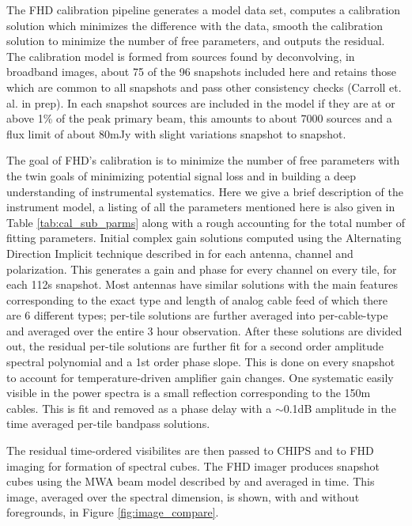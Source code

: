 \documentclass[twolcolumn,iop]{emulateapj}
\begin{document}
The FHD calibration pipeline generates a model data set, computes a calibration solution which minimizes the difference with the data, smooth the calibration solution to minimize the number of free parameters, and outputs the residual. The calibration model is formed from sources found by deconvolving, in broadband images, about 75 of the 96 snapshots included here and retains those which are common to all snapshots and pass other consistency checks (Carroll et. al. in prep). In each snapshot sources are included in the model if they are at or above 1\% of the peak primary beam, this amounts to about 7000 sources and a flux limit of about 80mJy with slight variations snapshot to snapshot. %


The goal of FHD's calibration is to minimize the number of free parameters with the twin goals of minimizing potential signal loss and in building a deep understanding of instrumental systematics. Here we give a brief description of the instrument model, a listing of all the parameters mentioned here is also given in Table \ref{tab:cal_sub_parms} along with a rough accounting for the total number of fitting parameters. Initial complex gain solutions computed using the Alternating Direction Implicit technique described in \citet{sal14} for each antenna, channel and polarization.  This generates a gain and phase for every channel on every tile, for each 112s snapshot.  Most antennas have similar solutions with the main features corresponding to the exact type and length of analog cable feed of which there are 6 different types; per-tile solutions are further averaged into per-cable-type and averaged over the entire 3 hour observation. After these solutions are divided out, the residual per-tile solutions are further fit for a second order amplitude spectral polynomial and a 1st order phase slope. This is done on every snapshot to account for temperature-driven amplifier gain changes. 
One systematic easily visible in the power spectra is a small reflection corresponding to the 150m cables. This is fit and removed as a phase delay with a $\sim$0.1dB amplitude in the time averaged per-tile bandpass solutions.

The residual time-ordered visibilites are then passed to CHIPS and to FHD imaging for formation of spectral cubes.  The FHD imager  produces snapshot cubes using the MWA beam model described by \cite{Sutinjo:2015RaSc...50...52S} and averaged in time. This image, averaged over the spectral dimension, is shown, with and without foregrounds, in Figure \ref{fig:image_compare}.
\end{document}
